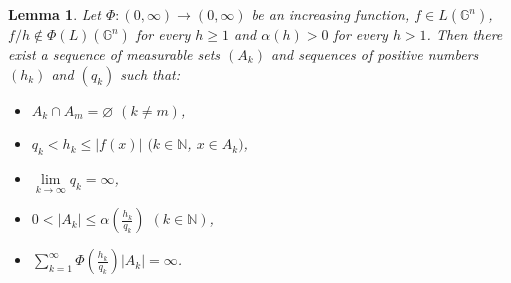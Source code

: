\documentclass[12pt,reqno]{article}
\newtheorem{lemma}{Lemma}
\theoremstyle{remark}
\begin{document}
\begin{lemma}\label{lem:4}
Let $\Phi: (0,\infty)\rightarrow (0,\infty)$  be an increasing function, $f\in L(\mathbb{G}^n)$, $f/h\not\in\Phi(L)(\mathbb{G}^n)$ for every $h\geq 1$ and $\alpha(h)>0$ for every $h>1$. Then there exist a sequence of measurable sets $(A_k)$ and sequences of positive numbers $(h_k)$ and $(q_k)$ such that:
\begin{itemize}
\item[$1)$] $A_k\cap A_m=\varnothing$ $(k\neq m)$,

\item[$2)$] $q_k<h_k\leq|f(x)|$ $(k\in\mathbb{N}$, $x\in A_k)$,

\item[$3)$] $\lim\limits_{k\to\infty} q_k=\infty$,

\item[$4)$] $0<|A_k|\leq\alpha(\frac{h_k}{q_k})$ $(k\in\mathbb{N})$,

\item[$5)$] $\sum\limits_{k=1}^\infty \Phi(\frac{h_k}{q_k})|A_k|=\infty$.
\end{itemize}
\end{lemma}
\end{document}
